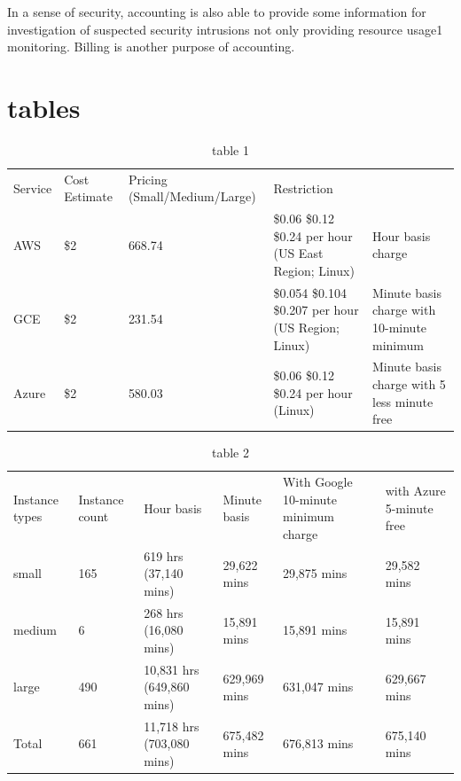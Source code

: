 \documentclass{sig-alternate}
\begin{document}
In a sense of security, accounting is also able to provide some information for investigation of suspected security intrusions not only providing resource usage1 monitoring. Billing is another purpose of accounting.


\section{tables}

\begin{table}[htb]
\caption{table 1}\label{T:tab1}
\begin{tabular}{lllll}
Service & Cost Estimate & Pricing (Small/Medium/Large) & Restriction \\
AWS & \$2 & 668.74  & \$0.06 \$0.12 \$0.24 per hour (US East Region; Linux) & Hour basis charge\\
GCE & \$2 & 231.54  & \$0.054 \$0.104 \$0.207 per hour (US Region; Linux) & Minute basis charge with 10-minute minimum\\
Azure & \$2 & 580.03  & \$0.06 \$0.12 \$0.24 per hour (Linux) & Minute basis charge with 5 less minute free\\
\end{tabular}
\end{table}

\begin{table}[htb]
\caption{table 2}\label{T:tab2}
\begin{tabular}{llllll}
Instance types & Instance count & Hour basis & Minute basis & With Google 10-minute minimum charge & with Azure 5-minute free \\
small & 165 & 619 hrs (37,140 mins) & 29,622 mins & 29,875 mins &29,582 mins \\
medium & 6 & 268 hrs (16,080 mins) & 15,891 mins & 15,891 mins & 15,891 mins\\
large & 490 & 10,831 hrs (649,860 mins) & 629,969 mins & 631,047 mins & 629,667 mins\\
Total & 661 & 11,718 hrs (703,080 mins) & 675,482 mins & 676,813 mins & 675,140 mins\\
\end{tabular}
\end{table}
\end{document}
